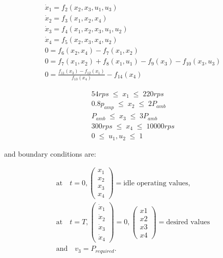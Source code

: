 \begin{equation*}
	\begin{aligned}
		\dot{x}_1 = f_2 (x_2,x_3,u_1,u_3 ) \\
		\dot{x}_2= f_3 (x_1,x_2,x_4 ) \\
		\dot{x}_3=f_4 (x_1,x_2,x_3,u_1,u_2 ) \\
		\dot{x}_4=f_5 (x_2,x_3,x_4,u_2 ) \\
		0= f_6 (x_2,x_4 )- f_7 (x_1,x_2 ) \\
		0= f_7(x_1,x_2 ) + f_8 (x_1,u_1 )-f_9 (x_3 )-f_{10}(x_3,u_3 )  \\
		0= \frac{f_{11}(x_3)-f_{12}(x_1 )} {f_{13}(x_4 )}-f_{14} (x_4 )
\end{aligned}
\end{equation*}

\begin{equation*}
	\begin{aligned}
      54 rps \;\leq  \;  x_1  \;\leq \; 220 rps \\
      0.8 p_{amp} \;\leq \;  x_2 \; \leq \; 2P_{amb} \\
      P_{amb} \;  \leq\; x_3 \;\leq \;  3P_{amb} \\
      300rps  \; \leq \; x_4 \;\leq \;   10000 rps \\
      0 \;\leq \;u_1,u_2 \;\leq \; 1
	\end{aligned}
\end{equation*}

and boundary conditions are:

\begin{equation*}
 \begin{aligned}
	\text{at}\quad t = 0,  \begin{pmatrix} x_1 \\ x_2 \\x_3 \\x_4  \end{pmatrix} = \text{idle operating values,} \\
	\text{at}\quad t = T,  \begin{pmatrix} \dot{x}_1 \\ \dot{x}_2 \\\dot{x}_3\\\dot{x}_4 \end{pmatrix} = 0,  \begin{pmatrix} x1 \\ x2 \\x3 \\x4  \end{pmatrix} = \text{desired values} \\
	\text{and}\quad v_3 = P_{required}.
 \end{aligned}
\end{equation*}

